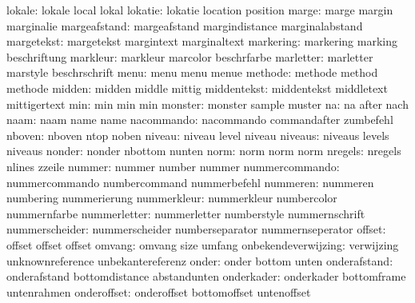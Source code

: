              lokale:  lokale               local               lokal
            lokatie:  lokatie              location            position
              marge:  marge                margin              marginalie
       margeafstand:  margeafstand         margindistance      marginalabstand
         margetekst:  margetekst           margintext          marginaltext
          markering:  markering            marking             beschriftung
           markleur:  markleur             marcolor            beschrfarbe
          marletter:  marletter            marstyle            beschrschrift
               menu:  menu                 menu                menue
            methode:  methode              method              methode
             midden:  midden               middle              mittig
        middentekst:  middentekst          middletext          mittigertext
                min:  min                  min                 min
            monster:  monster              sample              muster
                 na:  na                   after               nach
               naam:  naam                 name                name
         nacommando:  nacommando           commandafter        zumbefehl
             nboven:  nboven               ntop                noben
             niveau:  niveau               level               niveau
            niveaus:  niveaus              levels              niveaus
             nonder:  nonder               nbottom             nunten
               norm:  norm                 norm                norm
            nregels:  nregels              nlines              zzeile
             nummer:  nummer               number              nummer
     nummercommando:  nummercommando       numbercommand       nummerbefehl
           nummeren:  nummeren             numbering           nummerierung
        nummerkleur:  nummerkleur          numbercolor         nummernfarbe
       nummerletter:  nummerletter         numberstyle         nummernschrift
     nummerscheider:  nummerscheider       numberseparator     nummernseperator
             offset:  offset               offset              offset
             omvang:  omvang               size                umfang
onbekendeverwijzing:  verwijzing           unknownreference    unbekantereferenz
              onder:  onder                bottom              unten
       onderafstand:  onderafstand         bottomdistance      abstandunten
         onderkader:  onderkader           bottomframe         untenrahmen
        onderoffset:  onderoffset          bottomoffset        untenoffset
